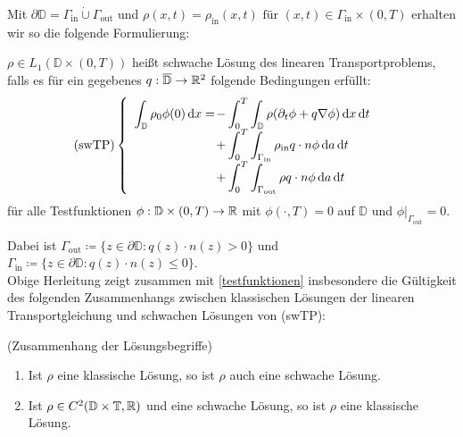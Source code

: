 Mit $ \partial \mathbb{D} = \Gamma_{\text{in}} \dot{\cup} \Gamma_{\text{out}} $ und 
$\rho(x,t) = \rho_{\text{in}}(x,t) \text{ für } (x,t) \in \Gamma_{\text{in}} \times (0,T)$ erhalten wir so die folgende Formulierung:
\begin{Definition} 
$ \rho \in L_1 (\mathbb{D} \times (0,T)) $ heißt schwache Lösung des linearen Transportproblems, falls es für ein gegebenes $ q : \overline{\mathbb{D}} \to \mathbb{R}^2 $ folgende Bedingungen erfüllt:
\begin{align*}
\text{(swTP)}
\begin{cases}
\begin{array}{rlll}
\displaystyle
\int_{\mathbb{D}} \rho_0 \phi(0) \, \mathrm{d} x = \mkern-16mu &- \displaystyle \int_{0}^{T} \int_{\mathbb{D}} \rho (\partial_t \phi + q \nabla \phi ) \, \mathrm{d} x \, \mathrm{d} t \\
&+\displaystyle\int_{0}^{T}  \int_{\Gamma_{\text{in}}} \rho_{\text{in}} q \cdot n \phi \, \mathrm{d} a  \, \mathrm{d} t \\
&+\displaystyle\int_{0}^{T}  \int_{\Gamma_{\text{out}}} \rho q \cdot n \phi \, \mathrm{d} a  \, \mathrm{d} t
\end{array}
\end{cases}	
\end{align*}
für alle Testfunktionen $ \phi: \mathbb{D} \times (0,T) \to \mathbb{R} $ mit $ \phi(\cdot,T) = 0 $ auf $ \mathbb{D}  $ und $ \phi|_{\Gamma_{\text{out}}} = 0 $.
\end{Definition}
Dabei ist $  \Gamma_{\text{out}} \coloneqq  \{ z \in \partial \mathbb{D}: q(z)\cdot n(z) > 0 \}$ 
und $  \Gamma_{\text{in}} \coloneqq  \{ z \in \partial \mathbb{D}: q(z)\cdot n(z) \leq 0 \} $. \\
Obige Herleitung zeigt zusammen mit \ref{testfunktionen} insbesondere die Gültigkeit des folgenden Zusammenhangs zwischen klassischen Lösungen der linearen Transportgleichung und schwachen Lösungen von (swTP):

\begin{Lemma}(Zusammenhang der Lösungsbegriffe)
	\begin{enumerate}
		\item Ist $ \rho $ eine klassische Lösung, so ist $ \rho $ auch eine schwache Lösung.
		\item Ist $ \rho \in C^2(\mathbb{D} \times \mathbb{T} , \mathbb{R} )$ und eine schwache Lösung, so ist $ \rho $ eine klassische Lösung. 
	\end{enumerate}
\end{Lemma}
